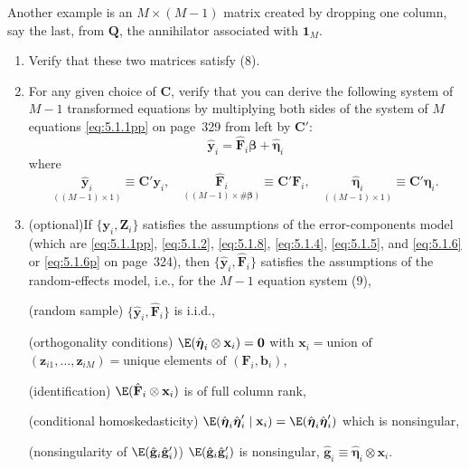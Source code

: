 \begin{problemset}
Another example is an $M \times (M-1)$ matrix created by dropping one column,
say the last, from $\mathbf{Q}$, the annihilator associated with $\mathbf{1}_M$.

\begin{enumerate}[label=(\alph*)]
\item Verify that these two matrices satisfy (8).

\item For any given choice of $\mathbf{C}$, verify that you can derive the following system
  of $M - 1$ transformed equations by multiplying both sides of the system of
  $M$ equations \eqref{eq:5.1.1pp} on page~329 from left by $\mathbf{C}'$:
  \begin{equation}
    \hat{\mathbf{y}}_i = \hat{\mathbf{F}}_i\boldsymbol{\beta} + \hat{\boldsymbol{\eta}}_i \tag{9}
  \end{equation}
  where
  \[
    \underset{((M-1) \times 1)}{\hat{\mathbf{y}}_i} \equiv \mathbf{C}'\mathbf{y}_i, \quad
    \underset{((M-1) \times \#\boldsymbol{\beta})}{\hat{\mathbf{F}}_i} \equiv \mathbf{C}'\mathbf{F}_i, \quad
    \underset{((M-1) \times 1)}{\hat{\boldsymbol{\eta}}_i} \equiv \mathbf{C}'\boldsymbol{\eta}_i.
  \]

\item (optional)\quad If $\{\mathbf{y}_i, \mathbf{Z}_i\}$ satisfies the assumptions of the error-components model
  (which are \eqref{eq:5.1.1pp}, \eqref{eq:5.1.2}, \eqref{eq:5.1.8},
  \eqref{eq:5.1.4}, \eqref{eq:5.1.5}, and \eqref{eq:5.1.6} or
  \eqref{eq:5.1.6p} on page~324), then
  $\{\hat{\mathbf{y}}_i, \hat{\mathbf{F}}_i\}$ satisfies the assumptions of the
  random-effects model, i.e., for the $M-1$ equation system (9),

  (random sample) $\{\hat{\mathbf{y}}_i, \hat{\mathbf{F}}_i\}$ is i.i.d.,

  (orthogonality conditions) $\E(\hat{\boldsymbol{\eta}}_i \otimes \mathbf{x}_i) = \mathbf{0}$ with
  $\mathbf{x}_i = \text{union of}$
  $(\mathbf{z}_{i1}, \ldots, \mathbf{z}_{iM}) = \text{unique elements of } (\mathbf{F}_i, \mathbf{b}_i)$,

  (identification) $\E(\hat{\mathbf{F}}_i \otimes \mathbf{x}_i)$ is of full column rank,

  (conditional homoskedasticity) $\E(\hat{\boldsymbol{\eta}}_i\hat{\boldsymbol{\eta}}_i' \mid \mathbf{x}_i)
  = \E(\hat{\boldsymbol{\eta}}_i\hat{\boldsymbol{\eta}}_i')$ which is nonsingular,

  (nonsingularity of $\E(\hat{\mathbf{g}}_i\hat{\mathbf{g}}_i')$) $\E(\hat{\mathbf{g}}_i\hat{\mathbf{g}}_i')$
  is nonsingular, $\hat{\mathbf{g}}_i \equiv \hat{\boldsymbol{\eta}}_i \otimes \mathbf{x}_i$.


\end{enumerate}
\end{problemset}
